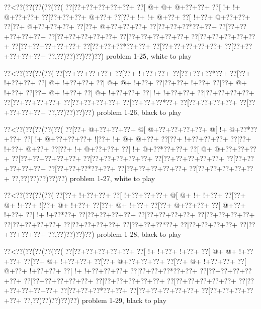 \vbox{\vbox{\goo
\0??<\0??(\0??(\0??(\0??(\0??(
\0??[\0??+\0??+\0??+\0??+\0??+
\0??[\- @+\- @+\- @+\0??+\0??+
\0??[\- !+\- !+\- @+\0??+\0??+
\0??[\0??+\0??+\0??+\- @+\0??+
\0??[\0??+\- !+\- !+\- @+\0??+
\0??[\- !+\0??+\- @+\0??+\0??+
\0??[\0??+\- @+\0??+\0??+\0??+
\0??[\0??+\- @+\0??+\0??+\0??+
\0??[\0??+\0??+\0??*\0??+\0??+
\0??[\0??+\0??+\0??+\0??+\0??+
\0??[\0??+\0??+\0??+\0??+\0??+
\0??[\0??+\0??+\0??+\0??+\0??+
\0??[\0??+\0??+\0??+\0??+\0??+
\0??[\0??+\0??+\0??+\0??+\0??+
\0??[\0??+\0??+\0??*\0??+\0??+
\0??[\0??+\0??+\0??+\0??+\0??+
\0??[\0??+\0??+\0??+\0??+\0??+
\0??,\0??)\0??)\0??)\0??)\0??)
}
\hfil problem 1-25, white to play\hfil\break
}

\vbox{\vbox{\goo
\0??<\0??(\0??(\0??(\0??(
\0??[\0??+\0??+\0??+\0??+
\0??[\0??+\- !+\0??+\0??+
\0??[\0??+\0??+\0??*\0??+
\0??[\0??+\- !+\0??+\0??+
\0??[\- @+\- !+\0??+\0??+
\0??[\- @+\- @+\- !+\0??+
\0??[\0??+\0??+\- !+\0??+
\0??[\0??+\- @+\- !+\0??+
\0??[\0??+\- @+\- !+\0??+
\0??[\- @+\- !+\0??+\0??+
\0??[\- !+\- !+\0??+\0??+
\0??[\0??+\0??+\0??+\0??+
\0??[\0??+\0??+\0??+\0??+
\0??[\0??+\0??+\0??+\0??+
\0??[\0??+\0??+\0??*\0??+
\0??[\0??+\0??+\0??+\0??+
\0??[\0??+\0??+\0??+\0??+
\0??,\0??)\0??)\0??)\0??)
}
\hfil problem 1-26, black to play\hfil\break
}

\vbox{\vbox{\goo
\0??<\0??(\0??(\0??(\0??(\0??(
\0??[\0??+\- @+\0??+\0??+\0??+
\- @[\- @+\0??+\0??+\0??+\0??+
\- @[\- !+\- @+\0??*\0??+\0??+
\0??[\- !+\- @+\0??+\0??+\0??+
\- ![\0??+\- !+\- @+\- @+\0??+
\0??[\0??+\- !+\0??+\0??+\0??+
\0??[\0??+\- !+\0??+\- @+\0??+
\0??[\0??+\- !+\- @+\0??+\0??+
\0??[\- !+\- @+\0??*\0??+\0??+
\0??[\- @+\- @+\0??+\0??+\0??+
\0??[\0??+\0??+\0??+\0??+\0??+
\0??[\0??+\0??+\0??+\0??+\0??+
\0??[\0??+\0??+\0??+\0??+\0??+
\0??[\0??+\0??+\0??+\0??+\0??+
\0??[\0??+\0??+\0??*\0??+\0??+
\0??[\0??+\0??+\0??+\0??+\0??+
\0??[\0??+\0??+\0??+\0??+\0??+
\0??,\0??)\0??)\0??)\0??)\0??)
}
\hfil problem 1-27, white to play\hfil\break
}

\vbox{\vbox{\goo
\0??<\0??(\0??(\0??(\0??(
\0??[\0??+\- !+\0??+\0??+
\0??[\- !+\0??+\0??+\0??+
\- @[\- @+\- !+\- !+\0??+
\0??[\0??+\- @+\- !+\0??+
\- ![\0??+\- @+\- !+\0??+
\0??[\0??+\- @+\- !+\0??+
\0??[\0??+\- @+\0??+\0??+
\0??[\- @+\0??+\- !+\0??+
\0??[\- !+\- !+\0??*\0??+
\0??[\0??+\0??+\0??+\0??+
\0??[\0??+\0??+\0??+\0??+
\0??[\0??+\0??+\0??+\0??+
\0??[\0??+\0??+\0??+\0??+
\0??[\0??+\0??+\0??+\0??+
\0??[\0??+\0??+\0??*\0??+
\0??[\0??+\0??+\0??+\0??+
\0??[\0??+\0??+\0??+\0??+
\0??,\0??)\0??)\0??)\0??)
}
\hfil problem 1-28, black to play\hfil\break
}

\vbox{\vbox{\goo
\0??<\0??(\0??(\0??(\0??(\0??(
\0??[\0??+\0??+\0??+\0??+\0??+
\0??[\- !+\- !+\0??+\- !+\0??+
\0??[\- @+\- @+\- !+\0??+\0??+
\0??[\0??+\- @+\- !+\0??+\0??+
\0??[\0??+\- @+\0??+\0??+\0??+
\0??[\0??+\- @+\- !+\0??+\0??+
\0??[\- @+\0??+\- !+\0??+\0??+
\0??[\- !+\- !+\0??+\0??+\0??+
\0??[\0??+\0??+\0??*\0??+\0??+
\0??[\0??+\0??+\0??+\0??+\0??+
\0??[\0??+\0??+\0??+\0??+\0??+
\0??[\0??+\0??+\0??+\0??+\0??+
\0??[\0??+\0??+\0??+\0??+\0??+
\0??[\0??+\0??+\0??+\0??+\0??+
\0??[\0??+\0??+\0??*\0??+\0??+
\0??[\0??+\0??+\0??+\0??+\0??+
\0??[\0??+\0??+\0??+\0??+\0??+
\0??,\0??)\0??)\0??)\0??)\0??)
}
\hfil problem 1-29, black to play\hfil\break
}

